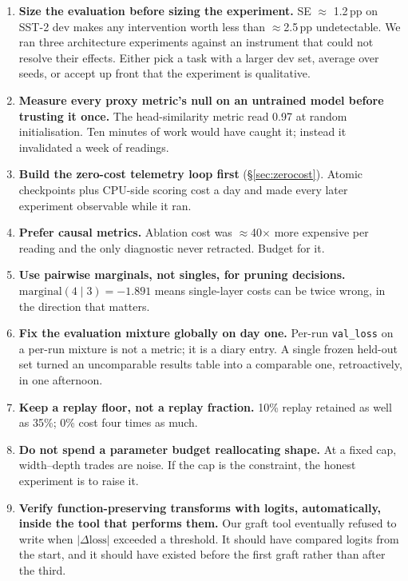 \documentclass[11pt,a4paper]{article}
\begin{document}
\begin{enumerate}
\item \textbf{Size the evaluation before sizing the experiment.} SE $\approx$ 1.2\,pp on SST-2
dev makes any intervention worth less than $\approx$2.5\,pp undetectable. We ran three
architecture experiments against an instrument that could not resolve their effects. Either
pick a task with a larger dev set, average over seeds, or accept up front that the experiment
is qualitative.
\item \textbf{Measure every proxy metric's null on an untrained model before trusting it once.}
The head-similarity metric read 0.97 at random initialisation. Ten minutes of work would have
caught it; instead it invalidated a week of readings.
\item \textbf{Build the zero-cost telemetry loop first} (\S\ref{sec:zerocost}). Atomic checkpoints plus CPU-side scoring cost a day and made every later experiment observable while it ran.
\item \textbf{Prefer causal metrics.} Ablation cost was $\approx$40$\times$ more expensive per
reading and the only diagnostic never retracted. Budget for it.
\item \textbf{Use pairwise marginals, not singles, for pruning decisions.}
$\mathrm{marginal}(4 \mid 3) = -1.891$ means single-layer costs can be twice wrong, in the
direction that matters.
\item \textbf{Fix the evaluation mixture globally on day one.} Per-run \texttt{val\_loss} on a
per-run mixture is not a metric; it is a diary entry. A single frozen held-out set turned an
uncomparable results table into a comparable one, retroactively, in one afternoon.
\item \textbf{Keep a replay floor, not a replay fraction.} 10\% replay retained as well as 35\%;
0\% cost four times as much.
\item \textbf{Do not spend a parameter budget reallocating shape.} At a fixed cap, width--depth
trades are noise. If the cap is the constraint, the honest experiment is to raise it.
\item \textbf{Verify function-preserving transforms with logits, automatically, inside the tool
that performs them.} Our graft tool eventually refused to write when
$|\Delta\text{loss}|$ exceeded a threshold. It should have compared logits from the start, and
it should have existed before the first graft rather than after the third.
\end{enumerate}

\end{document}
